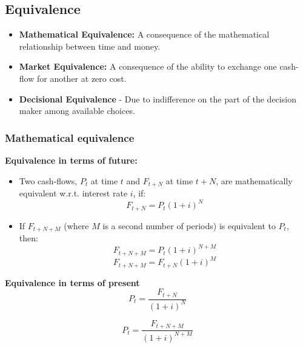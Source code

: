 \subsection{Equivalence}
\begin{definition}
    \begin{itemize}
        \item \textbf{Mathematical Equivalence:} A consequence of the mathematical relationship between time and money.
        \item \textbf{Market Equivalence:} A consequence of the ability to exchange one cash-flow for another at zero cost.
        \item \textbf{Decisional Equivalence} - Due to indifference on the part of the decision maker among available choices.
    \end{itemize}    
\end{definition}
    
    \subsubsection{Mathematical equivalence}
    \begin{definition}
        \textbf{Equivalence in terms of future:}
        \begin{itemize}
            \item Two cash-flows, \( P_t \) at time \( t \) and \( F_{t+N} \) at time \( t+N \), are mathematically equivalent w.r.t. interest rate \( i \), if:
            \begin{equation}
            F_{t+N} = P_t(1 + i)^N \tag{1}
            \end{equation}
        
            \item If \( F_{t+N+M} \) (where \( M \) is a second number of periods) is equivalent to \( P_t \), then:
            \begin{equation}
            F_{t+N+M} = P_t(1 + i)^{N+M} \tag{2}
            \end{equation}
            \begin{equation}
            F_{t+N+M} = F_{t+N}(1 + i)^M \tag{3}
            \end{equation}
        \end{itemize} 
        
        \textbf{Equivalence in terms of present}
        \begin{equation}
        P_t = \frac{F_{t+N}}{(1 + i)^N}
        \end{equation}
        
        \begin{equation}
        P_t = \frac{F_{t+N+M}}{(1 + i)^{N+M}}
        \end{equation}

    \end{definition}

